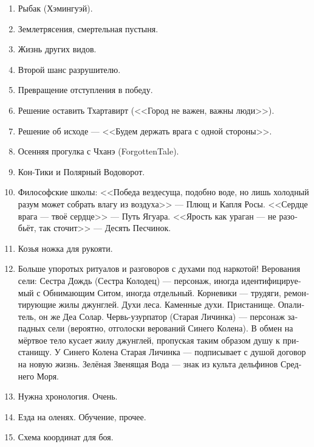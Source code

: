 \documentclass[a4paper,12pt,fleqn]{book}\usepackage{polyglossia}\setdefaultlanguage[babelshorthands=true]{russian}\setotherlanguage{english}\defaultfontfeatures{Ligatures=TeX,Mapping=tex-text}\usepackage{xcolor}\newcommand{\ml}[3]{#2}
\begin{document}
{\begin{enumerate}
\item Рыбак (Хэмингуэй).

\item Землетрясения, смертельная пустыня.

\item Жизнь других видов.

\item Второй шанс разрушителю.

\item Превращение отступления в победу.

\item Решение оставить Тхартавирт (<<Город не важен, важны люди>>).

\item Решение об исходе --- <<Будем держать врага с одной стороны>>.

\item Осенняя прогулка с Чханэ (ForgottenTale).

\item Кон-Тики и Полярный Водоворот.

\item Философские школы: <<Победа вездесуща, подобно воде, но лишь холодный разум может собрать влагу из воздуха>> --- Плющ и Капля Росы.
<<Сердце врага --- твоё сердце>> --- Путь Ягуара.
<<Ярость как ураган --- не разобьёт, так сточит>> --- Десять Песчинок.

\item Козья ножка для рукояти.

\item Больше упоротых ритуалов и разговоров с духами под наркотой!
Верования сели: Сестра Дождь (Сестра Колодец) --- персонаж, иногда идентифицируемый с Обнимающим Ситом, иногда отдельный.
Корневики --- трудяги, ремонтирующие жилы джунглей.
Духи леса.
Каменные духи.
Пристанище.
Опалитель, он же Деа Солар.
Червь-узурпатор (Старая Личинка) --- персонаж западных сели (вероятно, отголоски верований Синего Колена).
В обмен на мёртвое тело кусает жилу джунглей, пропуская таким образом душу к пристанищу.
У Синего Колена Старая Личинка --- подписывает с душой договор на новую жизнь.
Зелёная Звенящая Вода --- знак из культа дельфинов Среднего Моря.

\item Нужна хронология.
Очень.

\item Езда на оленях.
Обучение, прочее.

\item Схема координат для боя.


\end{enumerate}}
\end{document}
